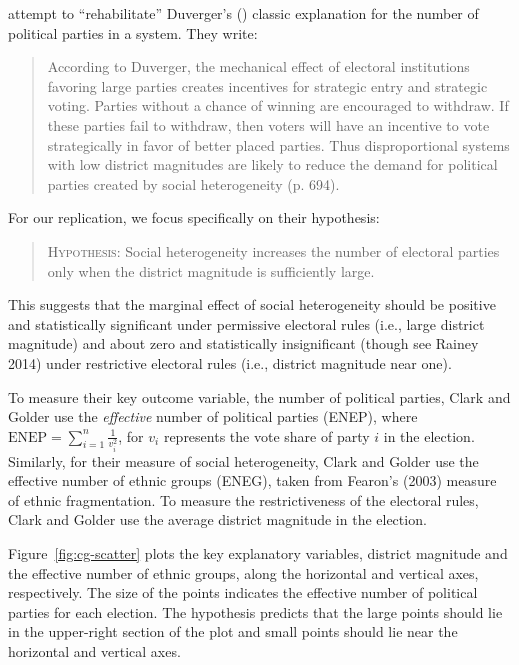 \documentclass[12pt]{article}
\begin{document}
\cite{ClarkGolder2006} attempt to ``rehabilitate'' Duverger's (\citeyear{Duverger1963}) classic explanation for the number of political parties in a system.
They write: 

\begin{quote}
According to Duverger, the mechanical effect of electoral institutions favoring large parties creates incentives for strategic entry and strategic voting. 
Parties without a chance of winning are encouraged to withdraw. 
If these parties fail to withdraw, then voters will have an incentive to vote strategically in favor of better placed parties. 
Thus disproportional systems with low district magnitudes are likely to reduce the demand for political parties created by social heterogeneity (p. 694).
\end{quote}

For our replication, we focus specifically on their hypothesis:
\begin{quote}
\textsc{Hypothesis:} Social heterogeneity increases the number of electoral parties only when the district magnitude is sufficiently large.
\end{quote}

This suggests that the marginal effect of social heterogeneity should be positive and statistically significant under permissive electoral rules (i.e., large district magnitude) and about zero and statistically insignificant (though see Rainey 2014) under restrictive electoral rules (i.e., district magnitude near one).

To measure their key outcome variable, the number of political parties, Clark and Golder use the \textit{effective} number of political parties (ENEP), where $\text{ENEP} = \sum_{i = 1}^n\frac{1}{v_i^2}$, for $v_i$ represents the vote share of party $i$ in the election. 
Similarly, for their measure of social heterogeneity, Clark and Golder use the effective number of ethnic groups (ENEG), taken from Fearon's (2003) measure of ethnic fragmentation. 
To measure the restrictiveness of the electoral rules, Clark and Golder use the average district magnitude in the election. 

Figure~\ref{fig:cg-scatter} plots the key explanatory variables, district magnitude and the effective number of ethnic groups, along the horizontal and vertical axes, respectively. 
The size of the points indicates the effective number of political parties for each election. 
The hypothesis predicts that the large points should lie in the upper-right section of the plot and small points should lie near the horizontal and vertical axes.
\end{document}
